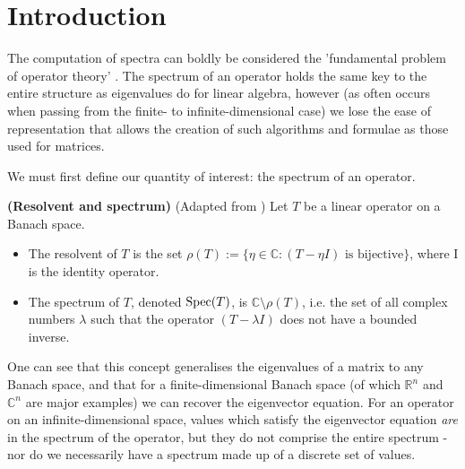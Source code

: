 \documentclass[../main.tex]{subfiles}
\begin{document}
\section{Introduction}
The computation of spectra can boldly be considered the 'fundamental problem of operator theory' \parencite{arveson2002short}. The spectrum
of an operator holds the same key to the entire structure as eigenvalues do for linear algebra, however (as often occurs when passing from 
the finite- to infinite-dimensional case) we lose the ease of representation that allows the creation of such algorithms and formulae as those 
used for matrices. 

We must first define our quantity of interest: the spectrum of an operator.
\begin{definition}{\textbf{(Resolvent and spectrum)}}
(Adapted from \parencite{evans2010partial}) Let $T$ be a linear operator on a Banach space.
\begin{itemize}
\item The resolvent of $T$ is the set $\rho(T) := \{\eta \in \mathbb{C} : (T - \eta I)\text{ is bijective}\}$, where I is the identity operator. 
\item The spectrum of $T$, denoted $\mathrm{Spec}(T)$, is $\mathbb{C} \setminus \rho(T)$, i.e. the set of all complex numbers $\lambda$ such 
that the operator $(T - \lambda I)$ does not have a bounded inverse.
\end{itemize}
\end{definition}

One can see that this concept generalises the eigenvalues of a matrix to any Banach space, and that for a finite-dimensional Banach space
(of which $\mathbb{R}^n$ and $\mathbb{C}^n$ are major examples) we can recover the eigenvector equation. For an operator on an
infinite-dimensional space, values which satisfy the eigenvector equation \emph{are} in the spectrum of the operator, but they do not
comprise the entire spectrum - nor do we necessarily have a spectrum made up of a discrete set of values.
\end{document}
